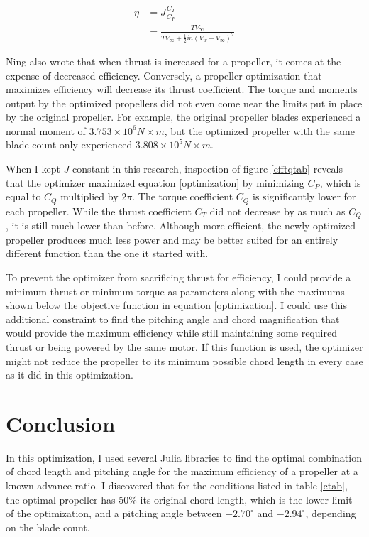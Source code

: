 \documentclass[journal ]{new-aiaa}
\newcounter{ctab}
\begin{document}
\begin{equation}
	\begin{aligned}
	\eta & = J \frac{C_{T}}{C_{P}} \\
	& = \frac{T V_{\infty}}{T V_{\infty} + \frac{1}{2} \dot{m} (V_{w} - V_{\infty})^{2}}
	\end{aligned}
\label{etqeq}
\end{equation}

Ning also wrote that when thrust is increased for a propeller, it comes at the expense of decreased efficiency\cite{ComAer}. Conversely, a propeller optimization that maximizes efficiency will decrease its thrust coefficient. The torque and moments output by the optimized propellers did not even come near the limits put in place by the original propeller. For example, the original propeller blades experienced a normal moment of $3.753 \times 10^{6}N \times m$, but the optimized propeller with the same blade count only experienced $3.808 \times 10^{5} N \times m$.

When I kept $J$ constant in this research, inspection of figure \eqref{efftqtab} reveals that the optimizer maximized equation \eqref{optimization} by minimizing $C_{P}$, which is equal to $C_{Q}$ multiplied by $2 \pi$. The torque coefficient $C_{Q}$ is significantly lower for each propeller. While the thrust coefficient $C_{T}$ did not decrease by as much as $C_{Q}$, it is still much lower than before. Although more efficient, the newly optimized propeller produces much less power and may be better suited for an entirely different function than the one it started with.

To prevent the optimizer from sacrificing thrust for efficiency, I could provide a minimum thrust or minimum torque as parameters along with the maximums shown below the objective function in equation \eqref{optimization}. I could use this additional constraint to find the pitching angle and chord magnification that would provide the maximum efficiency while still maintaining some required thrust or being powered by the same motor. If this function is used, the optimizer might not reduce the propeller to its minimum possible chord length in every case as it did in this optimization.


\section{Conclusion}

In this optimization, I used several Julia libraries to find the optimal combination of chord length and pitching angle for the maximum efficiency of a propeller at a known advance ratio. I discovered that for the conditions listed in table \eqref{ctab}, the optimal propeller has 50\% its original chord length, which is the lower limit of the optimization, and a pitching angle between $-2.70^{\circ}$ and $-2.94^{\circ}$, depending on the blade count.
\end{document}
